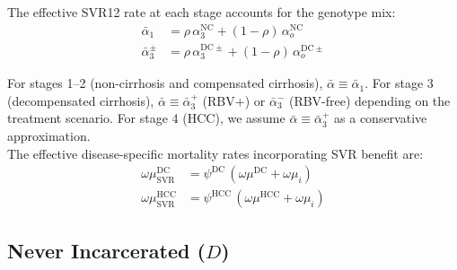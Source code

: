\noindent The effective SVR12 rate at each stage accounts for the genotype 
mix:
\begin{align*}
\bar{\alpha}_1 &= \rho\,\alpha_3^{\mathrm{NC}} + (1-\rho)\,\alpha_o^{\mathrm{NC}} \\
\bar{\alpha}_3^{\pm} &= \rho\,\alpha_3^{\mathrm{DC}\pm} + (1-\rho)\,\alpha_o^{\mathrm{DC}\pm}
\end{align*}

\noindent For stages 1--2 (non-cirrhosis and compensated cirrhosis), 
$\bar{\alpha} \equiv \bar{\alpha}_1$. For stage 3 (decompensated cirrhosis), 
$\bar{\alpha} \equiv \bar{\alpha}_3^{+}$ (RBV+) or $\bar{\alpha}_3^{-}$ 
(RBV-free) depending on the treatment scenario. For stage 4 (HCC), 
we assume $\bar{\alpha} \equiv \bar{\alpha}_3^{+}$ as a conservative 
approximation. \\[1em]

\noindent The effective disease-specific mortality rates incorporating 
SVR benefit are:
\begin{align*}
\omega\mu^{\mathrm{DC}}_{\mathrm{SVR}} &= \psi^{\mathrm{DC}}\,(\omega\mu^{\mathrm{DC}}+\omega\mu_i) \\
\omega\mu^{\mathrm{HCC}}_{\mathrm{SVR}} &= \psi^{\mathrm{HCC}}\,(\omega\mu^{\mathrm{HCC}}+\omega\mu_i)
\end{align*}

\subsection{Never Incarcerated ($D$)}


